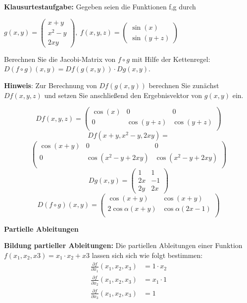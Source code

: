\documentclass[fontset=ubuntu,12pt,a4paper,fleqn]{article}
\begin{document}
\begin{multicols}{2}
\textbf{Klausurtestaufgabe:} Gegeben seien die Funktionen f,g durch\\
{\fontsize{9}{10} \(g(x,y)=\begin{pmatrix}
x+y \\ x^2-y \\ 2xy
\end{pmatrix},\ f(x,y,z)=\begin{pmatrix}
\sin(x) \\ \sin(y+z)
\end{pmatrix}\)

Berechnen Sie die Jacobi-Matrix von \(f\circ g\) mit Hilfe der Kettenregel: \(D(f\circ g)(x,y)=Df(g(x,y))\cdot Dg(x,y)\).

\textbf{Hinweis}: Zur Berechnung von \(Df(g(x,y))\) berechnen Sie zunächst \(Df(x,y,z)\) und setzen Sie anschließend den Ergebnisvektor von \(g(x,y)\) ein.

\[Df(x,y,z)=\begin{pmatrix}
\cos(x) & 0 & 0 \\
0 & \cos(y+z) & \cos(y+z) \\\end{pmatrix}\]
\[Df(x+y,x^2-y,2xy)=\]
\[\begin{pmatrix}
\cos(x+y) & 0 & 0 \\
0 & \cos(x^2-y+2xy) & \cos(x^2-y+2xy) \\\end{pmatrix}\]
\[Dg(x,y)=\begin{pmatrix}
1 & 1 \\
2x & -1 \\
2y & 2x\end{pmatrix}\]
\[D(f\circ g)(x,y)=\begin{pmatrix}
\cos(x+y) & \cos(x+y) \\
2\cos\alpha(x+y) & \cos\alpha(2x-1) \\
\end{pmatrix}\]}
\newpage
\end{multicols}






{\Large\textbf{Partielle Ableitungen}\par}

\textbf{Bildung partieller Ableitungen:}
Die partiellen Ableitungen einer Funktion $f(x_1,x_2,x3)= x_1\cdot x_2+x3$ lassen sich sich wie folgt bestimmen:
\begin{align*}
\frac{\partial f}{\partial x_1}(x_1,x_2,x_3) &= 1\cdot x_2\\
\frac{\partial f}{\partial x_2}(x_1,x_2,x_3) &= x_1\cdot 1\\
\frac{\partial f}{\partial x_3}(x_1,x_2,x_3) &= 1
\end{align*}
\end{document}
